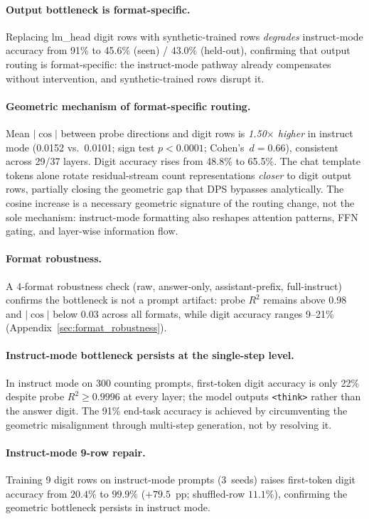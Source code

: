 \documentclass{article}
\begin{document}
\paragraph{Output bottleneck is format-specific.}
Replacing lm\_head digit rows with synthetic-trained rows \emph{degrades}
instruct-mode accuracy from 91\% to 45.6\% (seen) / 43.0\% (held-out),
confirming that output routing is format-specific:
the instruct-mode pathway already compensates without intervention,
and synthetic-trained rows disrupt it.

\paragraph{Geometric mechanism of format-specific routing.}
\label{sec:instruct}
Mean $|\cos|$ between probe directions and digit rows is \emph{1.50$\times$ higher}
in instruct mode (0.0152 vs.\ 0.0101; sign test $p < 0.0001$; Cohen's~$d = 0.66$),
consistent across 29/37 layers.
Digit accuracy rises from 48.8\% to 65.5\%.
The chat template tokens alone rotate residual-stream count representations
\emph{closer} to digit output rows, partially closing the geometric gap that DPS
bypasses analytically.
The cosine increase is a necessary geometric signature of the routing change,
not the sole mechanism: instruct-mode formatting also reshapes attention patterns,
FFN gating, and layer-wise information flow.

\paragraph{Format robustness.}
A 4-format robustness check (raw, answer-only, assistant-prefix, full-instruct)
confirms the bottleneck is not a prompt artifact:
probe $R^2$ remains above 0.98 and $|\cos|$ below 0.03 across all formats,
while digit accuracy ranges 9--21\% (Appendix~\ref{sec:format_robustness}).

\paragraph{Instruct-mode bottleneck persists at the single-step level.}
In instruct mode on 300 counting prompts, first-token digit accuracy is only 22\%
despite probe $R^2 \geq 0.9996$ at every layer; the model outputs \texttt{<think>}
rather than the answer digit.
The 91\% end-task accuracy is achieved by circumventing the geometric misalignment
through multi-step generation, not by resolving it.

\paragraph{Instruct-mode 9-row repair.}
Training 9 digit rows on instruct-mode prompts (3~seeds)
raises first-token digit accuracy from $20.4\%$ to $\mathbf{99.9\%}$ ($+79.5$~pp;
shuffled-row $11.1\%$), confirming the geometric bottleneck persists in instruct mode.
\end{document}
